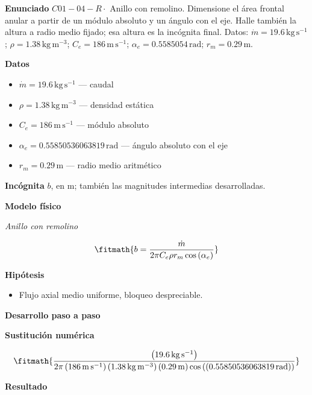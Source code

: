 \documentclass[10pt,openany]{book}
\begin{document}
\begin{tcolorbox}[title={Problema resuelto 4}, studiumworked, breakable]

\noindent\textbf{Enunciado}
\(C01-04-R \cdot\) Anillo con remolino. Dimensione el área frontal anular a partir de un módulo absoluto y un ángulo con el eje. Halle también la altura a radio medio fijado; esa altura es la incógnita final. Datos: \(\dot m=19.6\, \mathrm{kg}\,\mathrm{s}^{-1}\); \(\rho=1.38\, \mathrm{kg}\,\mathrm{m}^{-3}\); \(C_e=186\, \mathrm{m}\,\mathrm{s}^{-1}\); \(\alpha_e=0.5585054\, \mathrm{rad}\); \(r_m=0.29\, \mathrm{m}\).

\noindent\textbf{Datos}
\begin{itemize}
\item $\dot m = 19.6\,\mathrm{kg}\,\mathrm{s}^{-1}$ — caudal
\item $\rho = 1.38\,\mathrm{kg}\,\mathrm{m}^{-3}$ — densidad estática
\item $C_e = 186\,\mathrm{m}\,\mathrm{s}^{-1}$ — módulo absoluto
\item $\alpha_e = 0.55850536063819\,\mathrm{rad}$ — ángulo absoluto con el eje
\item $r_m = 0.29\,\mathrm{m}$ — radio medio aritmético
\end{itemize}

\noindent\textbf{Incógnita}
$b$, en $\mathrm{m}$; también las magnitudes intermedias desarrolladas.

\noindent\textbf{Modelo físico}

\noindent\textit{Anillo con remolino}

\[
\fitmath{b=\frac{\dot m}{2 \pi C_e \rho r_m \cos{\left(\alpha_e \right)}}}
\]

\noindent\textbf{Hipótesis}
\begin{itemize}
\item Flujo axial medio uniforme, bloqueo despreciable.
\end{itemize}

\noindent\textbf{Desarrollo paso a paso}



\noindent\textbf{Sustitución numérica}

\[
\fitmath{\frac{\left(19.6\,\mathrm{kg}\,\mathrm{s}^{-1}\right)}{2 \pi \left(186\,\mathrm{m}\,\mathrm{s}^{-1}\right) \left(1.38\,\mathrm{kg}\,\mathrm{m}^{-3}\right) \left(0.29\,\mathrm{m}\right) \cos{\left(\left(0.55850536063819\,\mathrm{rad}\right) \right)}}}
\]

\noindent\textbf{Resultado}


\end{tcolorbox}
\end{document}
